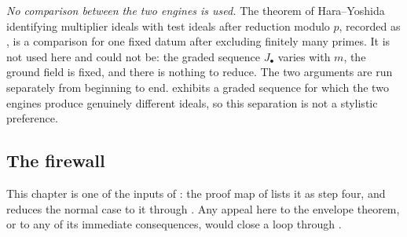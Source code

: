 \emph{No comparison between the two engines is used.}  The theorem of
Hara--Yoshida identifying multiplier ideals with test ideals after reduction
modulo $p$, recorded as , is a comparison for
one fixed datum after excluding finitely many primes.  It is not used here
and could not be: the graded sequence $J_\bullet$ varies with $m$, the
ground field is fixed, and there is nothing to reduce.  The two arguments
are run separately from beginning to end.   exhibits a
graded sequence for which the two engines produce genuinely different ideals,
so this separation is not a stylistic preference.

\subsection{The firewall}
\label{sec:ch40-firewall}

This chapter is one of the inputs of : the proof
map of  lists it as step four, and
 reduces the normal case to it through
.  Any appeal here to the envelope theorem, or
to any of its immediate consequences, would close a loop through
.

